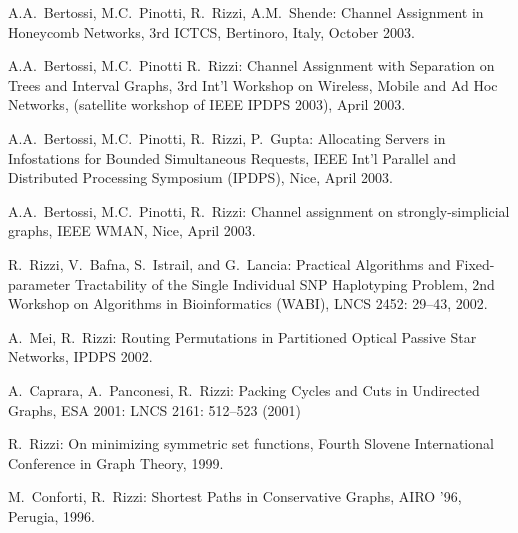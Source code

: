 \begin{etaremune}
\vspace{-1.8mm}
  \item {A.A.~Bertossi, M.C.~Pinotti, R.~Rizzi, A.M.~Shende:}
   \newblock Channel Assignment in Honeycomb Networks,
   \newblock 3rd ICTCS,
   \newblock Bertinoro, Italy, October 2003.

\vspace{-1.8mm}
  \item {A.A.~Bertossi, M.C.~Pinotti R.~Rizzi:}
   \newblock Channel Assignment with Separation on Trees and Interval Graphs,
   \newblock 3rd Int’l Workshop on Wireless, Mobile and Ad Hoc Networks,
   \newblock (satellite workshop of IEEE IPDPS 2003),
   \newblock April 2003.

\vspace{-1.8mm}
  \item {A.A.~Bertossi, M.C.~Pinotti, R.~Rizzi, P.~Gupta:}
   \newblock Allocating Servers in Infostations for Bounded Simultaneous Requests,
   \newblock IEEE Int’l Parallel and Distributed Processing Symposium (IPDPS),
   \newblock Nice, April 2003.

\vspace{-1.8mm}
  \item {A.A.~Bertossi, M.C.~Pinotti, R.~Rizzi:}
   \newblock Channel assignment on strongly-simplicial graphs,
   \newblock IEEE WMAN,
   \newblock Nice, April 2003.

\vspace{-1.8mm}
  \item {R.~Rizzi, V.~Bafna, S.~Istrail, and G.~Lancia:}
   \newblock Practical Algorithms and Fixed-parameter Tractability
   \newblock of the Single Individual SNP Haplotyping Problem,
   \newblock 2nd Workshop on Algorithms in Bioinformatics (WABI),
   \newblock LNCS 2452: 29--43, 2002.

\vspace{-1.8mm}
  \item {A.~Mei, R.~Rizzi:}
   \newblock Routing Permutations in Partitioned Optical Passive Star Networks,
   \newblock IPDPS 2002.

\vspace{-1.8mm}
  \item {A.~Caprara, A.~Panconesi, R.~Rizzi:}
   \newblock  Packing Cycles and Cuts in Undirected Graphs,
   \newblock ESA 2001:
   \newblock LNCS 2161: 512--523 (2001)

\vspace{-1.8mm}
  \item {R.~Rizzi:}
   \newblock On minimizing symmetric set functions,
   \newblock Fourth Slovene International Conference
             in Graph Theory, 1999.

\vspace{-1.8mm}
  \item {M.~Conforti, R.~Rizzi:}
   \newblock Shortest Paths in Conservative Graphs,
   \newblock AIRO '96, Perugia, 1996.

\end{etaremune}
